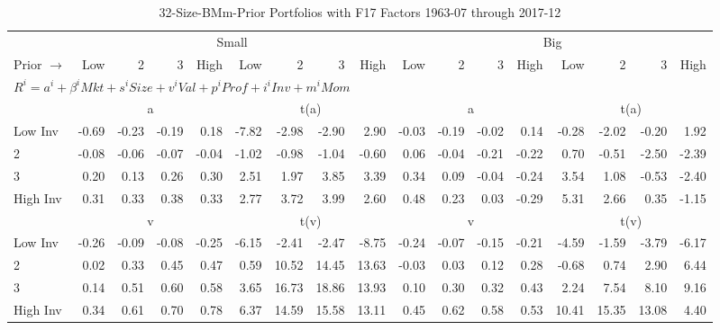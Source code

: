 
\begin{table}[!ht]
\footnotesize
\centering
\caption{32-Size-BMm-Prior Portfolios with F17 Factors 1963-07 through 2017-12}
\begin{tabular}{lrrrrrrrrrrrrrrrr}
  \toprule
    & \multicolumn{8}{c}{Small} & \multicolumn{8}{c}{Big} \\
      \cmidrule(r){2-9} \cmidrule(r){10-17}
    Prior $\rightarrow$ & Low & 2 & 3 & High & Low & 2 & 3 & High & Low & 2 & 3 & High & Low & 2 & 3 & High \\ 
  \midrule
  \multicolumn{17}{l}{$R^i=a^i+\beta^iMkt+s^iSize+v^iVal+p^iProf+i^iInv+m^iMom$} \\

  
    
      & \multicolumn{4}{c}{a} & \multicolumn{4}{c}{t(a)}
    
      & \multicolumn{4}{c}{a} & \multicolumn{4}{c}{t(a)}
    
    \\
      \cmidrule(r){2-5} \cmidrule(r){6-9} \cmidrule(r){10-13} \cmidrule(r){14-17}

    Low Inv   & -0.69  & -0.23  & -0.19  & 0.18  & -7.82  & -2.98  & -2.90  & 2.90  & -0.03  & -0.19  & -0.02  & 0.14  & -0.28  & -2.02  & -0.20  & 1.92  \\
           2  & -0.08  & -0.06  & -0.07  & -0.04  & -1.02  & -0.98  & -1.04  & -0.60  & 0.06  & -0.04  & -0.21  & -0.22  & 0.70  & -0.51  & -2.50  & -2.39  \\
           3  & 0.20  & 0.13  & 0.26  & 0.30  & 2.51  & 1.97  & 3.85  & 3.39  & 0.34  & 0.09  & -0.04  & -0.24  & 3.54  & 1.08  & -0.53  & -2.40  \\
    High Inv  & 0.31  & 0.33  & 0.38  & 0.33  & 2.77  & 3.72  & 3.99  & 2.60  & 0.48  & 0.23  & 0.03  & -0.29  & 5.31  & 2.66  & 0.35  & -1.15  \\

  
    
      & \multicolumn{4}{c}{v} & \multicolumn{4}{c}{t(v)}
    
      & \multicolumn{4}{c}{v} & \multicolumn{4}{c}{t(v)}
    
    \\
      \cmidrule(r){2-5} \cmidrule(r){6-9} \cmidrule(r){10-13} \cmidrule(r){14-17}

    Low Inv   & -0.26  & -0.09  & -0.08  & -0.25  & -6.15  & -2.41  & -2.47  & -8.75  & -0.24  & -0.07  & -0.15  & -0.21  & -4.59  & -1.59  & -3.79  & -6.17  \\
           2  & 0.02  & 0.33  & 0.45  & 0.47  & 0.59  & 10.52  & 14.45  & 13.63  & -0.03  & 0.03  & 0.12  & 0.28  & -0.68  & 0.74  & 2.90  & 6.44  \\
           3  & 0.14  & 0.51  & 0.60  & 0.58  & 3.65  & 16.73  & 18.86  & 13.93  & 0.10  & 0.30  & 0.32  & 0.43  & 2.24  & 7.54  & 8.10  & 9.16  \\
    High Inv  & 0.34  & 0.61  & 0.70  & 0.78  & 6.37  & 14.59  & 15.58  & 13.11  & 0.45  & 0.62  & 0.58  & 0.53  & 10.41  & 15.35  & 13.08  & 4.40  \\


\end{tabular}
\end{table}
